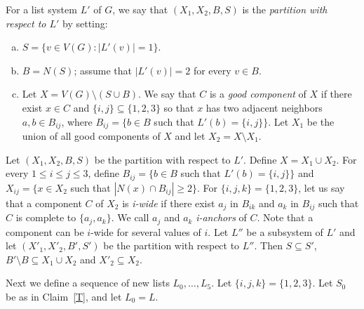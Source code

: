 \documentclass[11pt]{article}
\begin{document}
For a list system $L'$ of $G$, we say that $(X_1, X_2, B, S)$ is the \emph{partition with respect to $L'$} by setting: 
\begin{enumerate}[(a)]
	\item $S=\{v\in V(G):|L'(v)|=1\}$.
	\item $ B=N(S) $; assume that $|L'(v)|=2$ for every $v\in B$.
	\item Let $ X=V(G) \setminus (S\cup B) $. We say that $C$ is a \emph{good component} of $X$ if there exist $x \in C$ and $\{i,j\}\subseteq \{1,2,3\}$ so that $x$ has two adjacent neighbors $a,b \in B_{ij} $, where $ B_{ij}=\{b\in B $ such that $ L'(b)=\{i,j\}\} $. 
	Let $ X_1 $ be the union of all good components of $X$ and let $ X_2=X\setminus X_1 $. 

\end{enumerate}


Let $(X_1, X_2, B, S)$ be the partition with respect to $L'$.  
Define $X=X_1\cup X_2$. For every $1\leq i\leq j\leq 3$, define $ B_{ij}=\{b\in B $ such that $ L'(b)=\{i,j\}\} $ and $ X_{ij}=\{x\in X_2$ such that $ |N(x)\cap B_{ij}|\geq 2\} $.  For $ \{i,j,k\}=\{1,2,3\} $, let us say that a component $ C $ of $ X_2 $ is \emph{i-wide} if there exist $ a_j $ in $ B_{ik} $ and $ a_k $ in $ B_{ij} $ such that $ C $ is complete to $ \{a_j,a_k\} $. 
We call $ a_j $ and $ a_k $ \emph{i-anchors} of $ C $. 
Note that a component can be $ i $-wide for several values of $ i $. Let $L''$ be a subsystem of $L'$ and let $(X'_1, X'_2, B', S')$ be the partition with respect to $L''$. Then $S\subseteq S'$, $B'\setminus B \subseteq X_1\cup X_2$ and $ X'_2\subseteq X_2$.


 Next we define a sequence of new lists $L_0,\ldots,L_5$. Let $\{i,j,k\}=\{1,2,3\}$. Let $S_0$ be as in Claim~\ref{T}, and let $L_0=L$.
 


\end{document}
